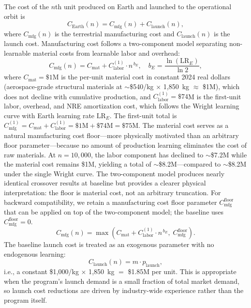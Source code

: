 \documentclass[preprint,12pt]{elsarticle}
\begin{document}
The cost of the $n$th unit produced on Earth and launched to the operational orbit is
\begin{equation}
  C_{\mathrm{Earth}}(n) = C_{\mathrm{mfg}}(n) + C_{\mathrm{launch}}(n),
  \label{eq:earth_unit}
\end{equation}
where $C_{\mathrm{mfg}}(n)$ is the terrestrial manufacturing cost and $C_{\mathrm{launch}}(n)$ is the launch cost. Manufacturing cost follows a two-component model separating non-learnable material costs from learnable labor and overhead:
\begin{equation}
  C_{\mathrm{mfg}}(n) = C_{\mathrm{mat}} + C_{\mathrm{labor}}^{(1)} \cdot n^{\,b_E}, \quad b_E = \frac{\ln(\mathrm{LR}_E)}{\ln 2},
  \label{eq:earth_mfg}
\end{equation}
where $C_{\mathrm{mat}} = \$1$M is the per-unit material cost in constant 2024 real dollars (aerospace-grade structural materials at $\sim$\$540/kg $\times$ 1{,}850~kg $\approx$ \$1M), which does not decline with cumulative production, and $C_{\mathrm{labor}}^{(1)} = \$74$M is the first-unit labor, overhead, and NRE amortization cost, which follows the Wright learning curve with Earth learning rate $\mathrm{LR}_E$. The first-unit total is $C_{\mathrm{mfg}}^{(1)} = C_{\mathrm{mat}} + C_{\mathrm{labor}}^{(1)} = \$1\text{M} + \$74\text{M} = \$75\text{M}$. The material cost serves as a natural manufacturing cost floor---more physically motivated than an arbitrary floor parameter---because no amount of production learning eliminates the cost of raw materials. At $n = 10{,}000$, the labor component has declined to $\sim$\$7.2M while the material cost remains \$1M, yielding a total of $\sim$\$8.2M---compared to $\sim$\$8.2M under the single Wright curve. The two-component model produces nearly identical crossover results at baseline but provides a clearer physical interpretation: the floor is material cost, not an arbitrary truncation. For backward compatibility, we retain a manufacturing cost floor parameter $C_{\mathrm{mfg}}^{\mathrm{floor}}$ that can be applied on top of the two-component model; the baseline uses $C_{\mathrm{mfg}}^{\mathrm{floor}} = 0$.
\begin{equation}
  C_{\mathrm{mfg}}(n) = \max\!\left(C_{\mathrm{mat}} + C_{\mathrm{labor}}^{(1)} \cdot n^{\,b_E},\; C_{\mathrm{mfg}}^{\mathrm{floor}}\right).
  \label{eq:earth_mfg_floor}
\end{equation}
The baseline launch cost is treated as an exogenous parameter with no endogenous learning:
\begin{equation}
  C_{\mathrm{launch}}(n) = m \cdot p_{\mathrm{launch}},
  \label{eq:earth_launch_baseline}
\end{equation}
i.e., a constant \$1{,}000/kg $\times$ 1{,}850~kg $=$ \$1.85M per unit. This is appropriate when the program's launch demand is a small fraction of total market demand, so launch cost reductions are driven by industry-wide experience rather than the program itself.
\end{document}
